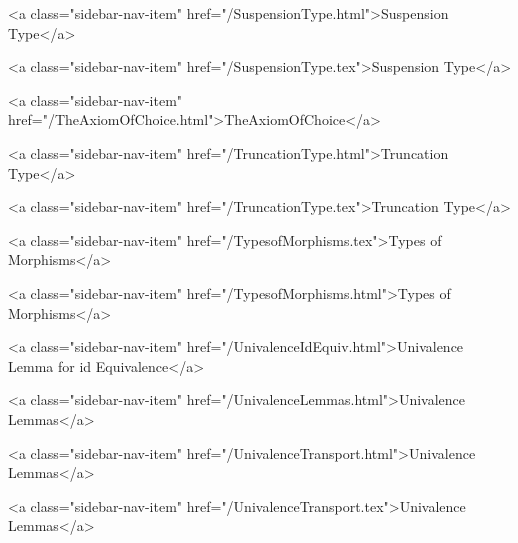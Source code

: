       
    
      
        
          <a class="sidebar-nav-item" href="/SuspensionType.html">Suspension Type</a>
        
      
    
      
        
          <a class="sidebar-nav-item" href="/SuspensionType.tex">Suspension Type</a>
        
      
    
      
        
          <a class="sidebar-nav-item" href="/TheAxiomOfChoice.html">TheAxiomOfChoice</a>
        
      
    
      
        
          <a class="sidebar-nav-item" href="/TruncationType.html">Truncation Type</a>
        
      
    
      
        
          <a class="sidebar-nav-item" href="/TruncationType.tex">Truncation Type</a>
        
      
    
      
        
          <a class="sidebar-nav-item" href="/TypesofMorphisms.tex">Types of Morphisms</a>
        
      
    
      
        
          <a class="sidebar-nav-item" href="/TypesofMorphisms.html">Types of Morphisms</a>
        
      
    
      
        
          <a class="sidebar-nav-item" href="/UnivalenceIdEquiv.html">Univalence Lemma for id Equivalence</a>
        
      
    
      
        
          <a class="sidebar-nav-item" href="/UnivalenceLemmas.html">Univalence Lemmas</a>
        
      
    
      
        
          <a class="sidebar-nav-item" href="/UnivalenceTransport.html">Univalence Lemmas</a>
        
      
    
      
        
          <a class="sidebar-nav-item" href="/UnivalenceTransport.tex">Univalence Lemmas</a>
        
